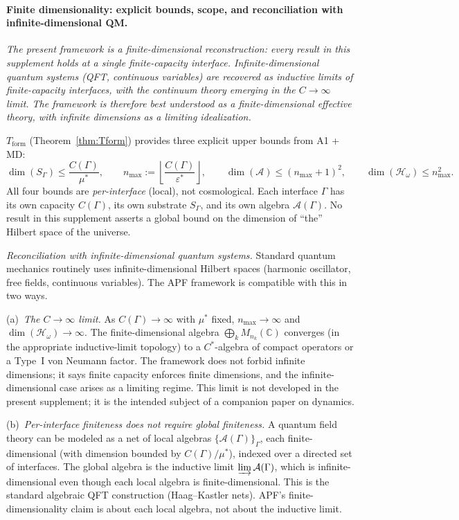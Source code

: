 \documentclass[11pt,a4paper]{article}
\theoremstyle{definition}
\newcommand{\eps}{\varepsilon}
\begin{document}
\paragraph{Finite dimensionality: explicit bounds, scope, and reconciliation with infinite-dimensional QM.}
\textit{The present framework is a finite-dimensional reconstruction: every result in this supplement holds at a single finite-capacity interface.  Infinite-dimensional quantum systems (QFT, continuous variables) are recovered as inductive limits of finite-capacity interfaces, with the continuum theory emerging in the $C \to \infty$ limit.  The framework is therefore best understood as a finite-dimensional effective theory, with infinite dimensions as a limiting idealization.}

\smallskip\noindent $T_{\mathrm{form}}$ (Theorem~\ref{thm:Tform}) provides three explicit upper bounds from A1 + MD:
\[
\dim(S_\Gamma) \le \frac{C(\Gamma)}{\mu^*}, \qquad
n_{\max} := \left\lfloor \frac{C(\Gamma)}{\eps^*} \right\rfloor, \qquad
\dim(\mathcal{A}) \le (n_{\max} + 1)^2, \qquad
\dim(\mathcal{H}_\omega) \le n_{\max}^2.
\]
All four bounds are \emph{per-interface} (local), not cosmological.  Each interface $\Gamma$ has its own capacity $C(\Gamma)$, its own substrate $S_\Gamma$, and its own algebra $\mathcal{A}(\Gamma)$.  No result in this supplement asserts a global bound on the dimension of ``the'' Hilbert space of the universe.

\smallskip\noindent\textit{Reconciliation with infinite-dimensional quantum systems.}  Standard quantum mechanics routinely uses infinite-dimensional Hilbert spaces (harmonic oscillator, free fields, continuous variables).  The APF framework is compatible with this in two ways.

\noindent(a)~\textit{The $C \to \infty$ limit.}  As $C(\Gamma) \to \infty$ with $\mu^*$ fixed, $n_{\max} \to \infty$ and $\dim(\mathcal{H}_\omega) \to \infty$.  The finite-dimensional algebra $\bigoplus_k M_{n_k}(\mathbb{C})$ converges (in the appropriate inductive-limit topology) to a $C^*$-algebra of compact operators or a Type~I von Neumann factor.  The framework does not forbid infinite dimensions; it says finite capacity enforces finite dimensions, and the infinite-dimensional case arises as a limiting regime.  This limit is not developed in the present supplement; it is the intended subject of a companion paper on dynamics.

\noindent(b)~\textit{Per-interface finiteness does not require global finiteness.}  A quantum field theory can be modeled as a net of local algebras $\{\mathcal{A}(\Gamma)\}_\Gamma$, each finite-dimensional (with dimension bounded by $C(\Gamma)/\mu^*$), indexed over a directed set of interfaces.  The global algebra is the inductive limit $\varinjlim \mathcal{A}(\Gamma)$, which is infinite-dimensional even though each local algebra is finite-dimensional.  This is the standard algebraic QFT construction (Haag--Kastler nets).  APF's finite-dimensionality claim is about each local algebra, not about the inductive limit.
\end{document}
